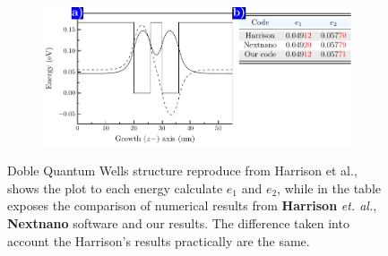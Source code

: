 \begin{figure}[htb!]
	\centering
	\begin{subfigure}{\textwidth}
	\includegraphics[width=\textwidth]{../figures/chapter-2/numerical-calculations/out/harrison-wells}
	\label{subfig:chapter-2-sec-numerical-comparison-harrison-plot-a}
	\label{subfig:chapter-2-sec-numerical-comparison-harrison-table-b}
	\end{subfigure}
	\caption{Doble Quantum Wells structure reproduce from  Harrison et al.\cite{harrison2016chap3},  shows the plot to each energy calculate $e_{1}$ and $e_{2}$, while in  the table exposes the comparison of  numerical results from \textbf{Harrison} \textit{et. al.}, \textbf{Nextnano} software \cite{Nextnanoharrison} and our results. The difference taken into account the Harrison's results practically are the same.  }
	\label{fig:chapter-2-sec-numerical-calculations-harrison-wells}
\end{figure}

